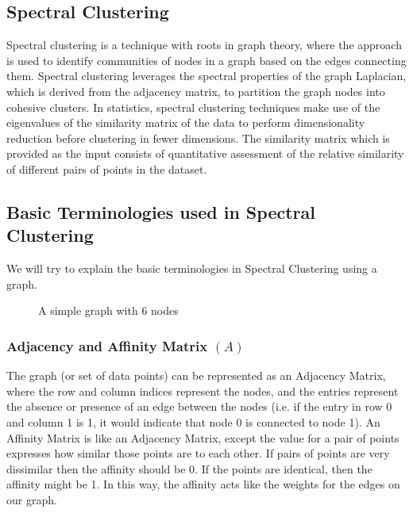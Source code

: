 \documentclass{article}
\begin{document}
    \subsection{Spectral Clustering}
    Spectral clustering is a technique with roots in graph theory, where the approach is used to identify communities of nodes in a graph based on the edges connecting them.
    Spectral clustering leverages the spectral properties of the graph Laplacian, which is derived from the adjacency matrix, to partition the graph nodes into cohesive clusters.
    In statistics, spectral clustering techniques make use of the eigenvalues of the similarity matrix of the data to perform dimensionality reduction before clustering in fewer dimensions. The similarity matrix which is provided as the input consists of quantitative assessment of the relative similarity of different pairs of points in the dataset.
    
    \subsection{Basic Terminologies used in Spectral Clustering}
    We will try to explain the basic terminologies in Spectral Clustering using a graph.
        \begin{figure}[ht]
        \centering
            \caption{A simple graph with 6 nodes}
            \label{fig:graph}
        \end{figure}
        \subsubsection{Adjacency and Affinity Matrix $(A)$}
        The graph (or set of data points) can be represented as an Adjacency Matrix, where the row and column indices represent the nodes, and the entries represent the absence or presence of an edge between the nodes (i.e. if the entry in row 0 and column 1 is 1, it would indicate that node 0 is connected to node 1).
        An Affinity Matrix is like an Adjacency Matrix, except the value for a pair of points expresses how similar those points are to each other. If pairs of points are very dissimilar then the affinity should be 0. If the points are identical, then the affinity might be 1. In this way, the affinity acts like the weights for the edges on our graph.\\
        
\end{document}
